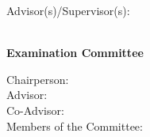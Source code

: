 \begin{titlepage}
\begin{center}
\begin{minipage}[t]{.5\textwidth}
  \begin{flushright}
    {\large Advisor(s)/Supervisor(s):\:}
  \end{flushright}
\end{minipage}%
\begin{minipage}[t]{.5\textwidth}
  \begin{flushleft}
    {\Supervisors}
  \end{flushleft}
\end{minipage}\\
%
\if{}
  \vspace*{\finalAdvisorsSpacing}
\else
  \vspace*{\draftAdvisorsSpacing}
\fi
\if{}
%
{\Large \textbf{Examination Committee}}\\[.25cm]
\begin{minipage}[t]{.5\textwidth}
  \begin{flushright}
    \if{}
    {\large Chairperson:\:}\\
    \fi
    {\large Advisor:\:}\\
    \if{}
    {\large Co-Advisor:}\\
    \fi
    \if{}
    {\large Members of the Committee:\:}
    \fi
  \end{flushright}
\end{minipage}%
\begin{minipage}[t]{.5\textwidth}
  \begin{flushleft}
    \if{}
    {\Chairperson}\\
    \fi
    {\Advisor}\\
    \if{}
    {\CoAdvisor}\\
    \fi
    \if{}
    {\CommitteeMembers}
    \fi
  \end{flushleft}
\end{minipage}\\[1.0cm]
%
\fi

\if{}
 \vspace*{\dateSpacing}
\fi

{\Large \textbf{\Month\:\Year}}\\
\end{center}
\end{titlepage}
